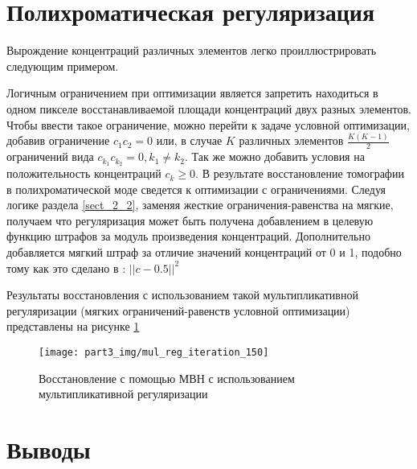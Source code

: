 
\section{Полихроматическая регуляризация}

Вырождение концентраций различных элементов легко проиллюстрировать следующим примером.


Логичным ограничением при оптимизации является запретить находиться в одном пикселе восстанавливаемой площади концентраций двух разных элементов.
Чтобы ввести такое ограничение, можно перейти к задаче условной оптимизации, добавив ограничение $c_1 c_2 = 0$ или, в случае $K$ различных элементов $\frac{ K (K - 1) } { 2 }$ ограничений вида $c_{k_1} c_{k_2} = 0, k_1 \neq k_2$.
Так же можно добавить условия на положительность концентраций $c_k \geq 0$.
В результате восстановление томографии в полихроматической моде сведется к оптимизации с ограничениями.
Следуя логике раздела \ref{sect_2_2}, заменяя жесткие ограничения-равенства на мягкие, получаем что регуляризация может быть получена добавлением в целевую функцию штрафов за модуль произведения концентраций. 
Дополнительно добавляется мягкий штраф за отличие значений концентраций от 0 и 1, подобно тому как это сделано в \cite{svets2016}: $||c - 0.5||^2$

Результаты восстановления с использованием такой мультипликативной регуляризации (мягких ограничений-равенств условной оптимизации) представлены на рисунке \ref{fig:wrart_mulreg_150}

\begin{figure}
  \centering
  \texttt{[image: part3\_img/mul\_reg\_iteration\_150]}
  \caption{Восстановление с помощью МВН с использованием мультипликативной регуляризации}
  \label{fig:wrart_mulreg_150}
\end{figure}


\section{Выводы} \label{sect_3_3}

